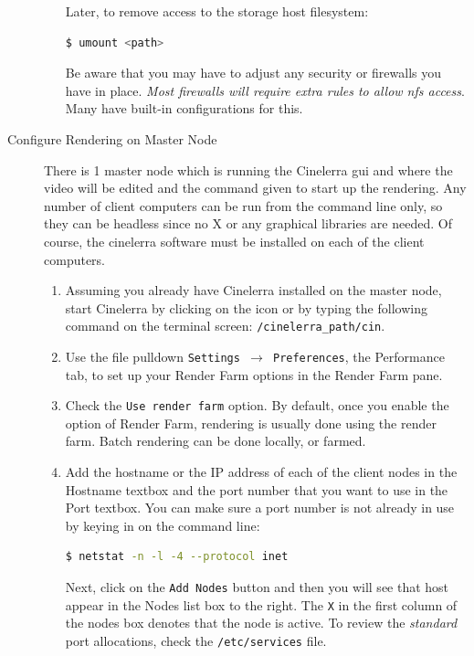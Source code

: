 \begin{description}
\begin{enumerate}
        Later, to remove access to the storage host filesystem:        
        \begin{lstlisting}[language=bash]
$ umount <path>
        \end{lstlisting}
        
        Be aware that you may have to adjust any security or firewalls you have in place.  \textit{Most firewalls will require extra rules to allow nfs access}.  Many have built-in configurations for this. 
    \end{enumerate}
    \item[Configure Rendering on Master Node] There is 1 master node which is running the Cinelerra gui and where the video will be edited and the command given to start up the rendering.  Any number of client computers can be run from the command line only, so they can be headless since no X or any graphical libraries are needed.  Of course, the cinelerra software must be installed on each of the client computers.
    \begin{enumerate}
        \item Assuming you already have Cinelerra installed on the master node, start Cinelerra by clicking on the
        icon or by typing the following command on the terminal screen:  \texttt{/{cinelerra\_path}/cin}.
        \item Use the file pulldown \texttt{Settings $\rightarrow$ Preferences}, the Performance tab, to set up your Render Farm
        options in the Render Farm pane.
        \item Check the \texttt{Use render farm} option.  By default, once you enable the option of Render Farm, rendering is usually done using the render farm.  Batch rendering can be done locally, or farmed.
        \item Add the hostname or the IP address of each of the client nodes in the Hostname textbox and the port
        number that you want to use in the Port textbox.  You can make sure a port number is not already in
        use by keying in on the command line:
        \begin{lstlisting}[language=bash]
$ netstat -n -l -4 --protocol inet
        \end{lstlisting}
        Next, click on the \texttt{Add Nodes}
        button and then you will see that host appear in the Nodes list box to the right.  The \texttt{X} in the first
        column of the nodes box denotes that the node is active.  To review the \textit{standard} port allocations,
        check the \texttt{/etc/services} file.

\end{enumerate}
\end{description}

